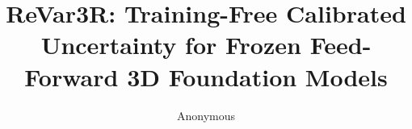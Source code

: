 \documentclass[10pt,twocolumn,letterpaper]{article}
\title{ReVar3R: Training-Free Calibrated Uncertainty for Frozen Feed-Forward 3D Foundation Models}
\author{Anonymous}
\begin{document}
\maketitle














\appendix








{\small


}
\end{document}
